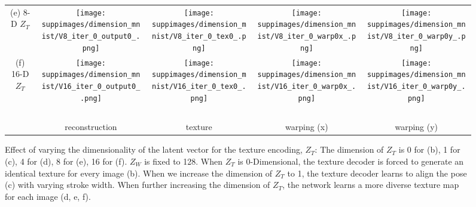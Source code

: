 \documentclass[runningheads]{llncs}
\begin{document}
\begin{figure}[ht]
\begin{center}
\begin{tabular}{c@{\hspace{0.1in}}c@{\hspace{0.1in}}c@{\hspace{0.1in}}c@{\hspace{0.1in}}c}
		(e) 8-D $Z_T$ &
		\texttt{[image: suppimages/dimension\_mnist/V8\_iter\_0\_output0\_.png]} &
		\texttt{[image: suppimages/dimension\_mnist/V8\_iter\_0\_tex0\_.png]} &
		\texttt{[image: suppimages/dimension\_mnist/V8\_iter\_0\_warp0x\_.png]} &
		\texttt{[image: suppimages/dimension\_mnist/V8\_iter\_0\_warp0y\_.png]} \\
		
		(f) 16-D $Z_T$ &
		\texttt{[image: suppimages/dimension\_mnist/V16\_iter\_0\_output0\_.png]} &
		\texttt{[image: suppimages/dimension\_mnist/V16\_iter\_0\_tex0\_.png]} &
		\texttt{[image: suppimages/dimension\_mnist/V16\_iter\_0\_warp0x\_.png]} &
		\texttt{[image: suppimages/dimension\_mnist/V16\_iter\_0\_warp0y\_.png]} \\~\\
		
		&
		reconstruction & texture & warping (x) & warping (y)
			
		\end{tabular}
	\end{center}
	\caption{Effect of varying the dimensionality of the latent vector for the texture encoding, $Z_T$: The dimension of $Z_T$ is 0 for (b), 1 for (c), 4 for (d), 8 for (e), 16 for (f). $Z_W$ is fixed to 128. When $Z_T$ is 0-Dimensional, the texture decoder is forced to generate an identical texture for every image (b). When we increase the dimension of $Z_T$ to 1, the texture decoder learns to align the pose (c) with varying stroke width. When further increasing the dimension of $Z_T$, the network learns a more diverse texture map for each image (d, e, f). }
\label{fig:supp_dimension_mnist}
\end{figure}
\end{document}
